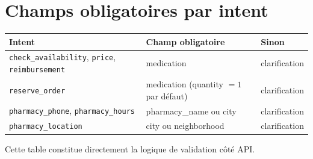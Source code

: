 \documentclass[11pt,a4paper]{article}
\begin{document}
\section{Champs obligatoires par intent}\label{sec:champs}

\begin{center}
\small
\begin{tabular}{@{}p{5.5cm} p{4.5cm} p{3cm}@{}}
\toprule
\textbf{Intent} & \textbf{Champ obligatoire} & \textbf{Sinon}\\
\midrule
\texttt{check\_availability}, \texttt{price}, \texttt{reimbursement} & medication & clarification\\
\texttt{reserve\_order} & medication (quantity $=1$ par d\'efaut) & clarification\\
\texttt{pharmacy\_phone}, \texttt{pharmacy\_hours} & pharmacy\_name ou city & clarification\\
\texttt{pharmacy\_location} & city ou neighborhood & clarification\\
\bottomrule
\end{tabular}
\end{center}

Cette table constitue directement la logique de validation c\^ot\'e API.
\end{document}
